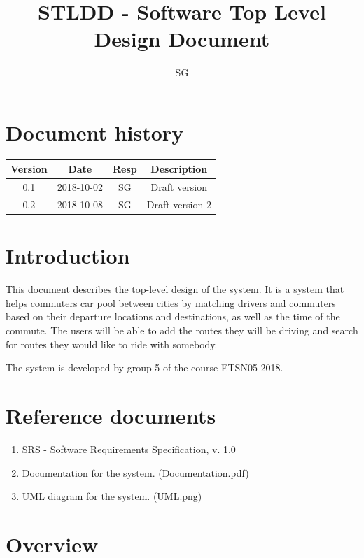 \documentclass{article}
\title{STLDD - Software Top Level Design Document}
\begin{document}
\author{SG}

\maketitle
\thispagestyle{fancy}
\tableofcontents
\newpage
\maketitle

\section*{Document history}
 \begin{tabular}{||c c c c||} 
 \hline
 Version & Date & Resp & Description \\ [0.5ex]
 \hline\hline
 0.1 & 2018-10-02 & SG & Draft version \\
 0.2 & 2018-10-08 & SG & Draft version 2 \\
 \hline
 

\end{tabular}

\section{Introduction}
This document describes the top-level design of the system. It is a system that helps commuters car pool between cities by matching drivers and commuters based on their departure locations and destinations, as well as the time of the commute. The users will be able to add the routes they will be driving and search for routes they would like to ride with somebody.

The system is developed by group 5 of the course ETSN05 2018.

\section{Reference documents}

\begin{enumerate}
    \item SRS - Software Requirements Specification, v. 1.0
    \item Documentation for the system. (Documentation.pdf)
    \item UML diagram for the system. (UML.png)
\end{enumerate}

\section{Overview}
\end{document}
